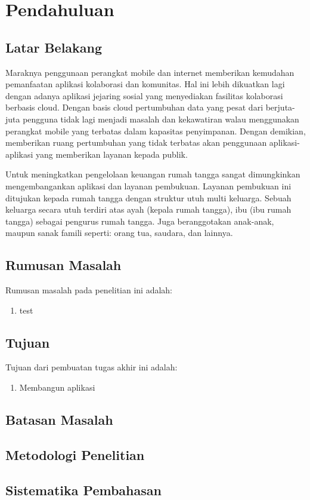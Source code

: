 \chapter{Pendahuluan}
\label{chap:pendahuluan}

\section{Latar Belakang}
\label{sec:latarbelakang}
Maraknya penggunaan perangkat mobile dan internet memberikan kemudahan pemanfaatan aplikasi kolaborasi dan komunitas. Hal ini lebih dikuatkan lagi dengan adanya aplikasi jejaring sosial yang menyediakan fasilitas kolaborasi berbasis cloud. Dengan basis cloud pertumbuhan data yang pesat dari berjuta-juta pengguna tidak lagi menjadi masalah dan kekawatiran walau menggunakan perangkat mobile yang terbatas dalam kapasitas penyimpanan. Dengan demikian, memberikan ruang pertumbuhan yang tidak terbatas akan penggunaan aplikasi-aplikasi yang memberikan layanan kepada publik.

Untuk meningkatkan pengelolaan keuangan rumah tangga sangat dimungkinkan mengembangankan aplikasi dan layanan pembukuan. Layanan pembukuan ini ditujukan kepada rumah tangga dengan struktur utuh multi keluarga. Sebuah keluarga secara utuh terdiri atas ayah (kepala rumah tangga), ibu (ibu rumah tangga) sebagai pengurus rumah tangga. Juga beranggotakan anak-anak, maupun sanak famili seperti: orang tua, saudara, dan lainnya.

\section{Rumusan Masalah}
\label{sec:rumusanmalasah}

Rumusan masalah pada penelitian ini adalah:
\begin{enumerate}
\item test
\end{enumerate}

\section{Tujuan}
\label{sec:tujuan}

Tujuan dari pembuatan tugas akhir ini adalah:
\begin{enumerate}
\item Membangun aplikasi
\end{enumerate}

\section{Batasan Masalah}
\label{sec:batasanmasalah}

\section{Metodologi Penelitian}
\label{sec:metodologipenelitian}

\section{Sistematika Pembahasan}
\label{sec:sistematikapembahasan}